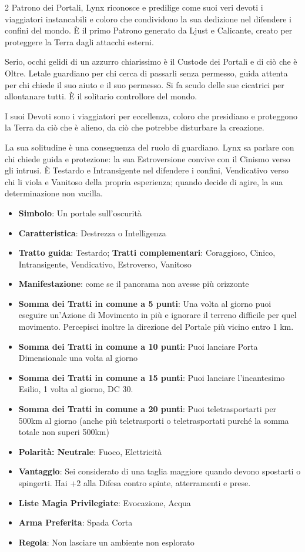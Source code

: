 \begin{multicols}{2}
Patrono dei Portali, Lynx riconosce e predilige come suoi veri devoti i viaggiatori instancabili e coloro che condividono la sua dedizione nel difendere i confini del mondo. È il primo Patrono generato da Ljust e Calicante, creato per proteggere la Terra dagli attacchi esterni.

Serio, occhi gelidi di un azzurro chiarissimo è il Custode dei Portali e di ciò che è Oltre. Letale guardiano per chi cerca di passarli senza permesso, guida attenta per chi chiede il suo aiuto e il suo permesso. Si fa scudo delle sue cicatrici per allontanare tutti. È il solitario controllore del mondo.

I suoi Devoti sono i viaggiatori per eccellenza, coloro che presidiano e proteggono la Terra da ciò che è alieno, da ciò che potrebbe disturbare la creazione.

La sua solitudine è una conseguenza del ruolo di guardiano. Lynx sa parlare con chi chiede guida e protezione: la sua Estroversione convive con il Cinismo verso gli intrusi. È Testardo e Intransigente nel difendere i confini, Vendicativo verso chi li viola e Vanitoso della propria esperienza; quando decide di agire, la sua determinazione non vacilla.

\begin{itemize}[leftmargin=*] \setlength{\itemsep}{0pt}
\item \textbf{Simbolo}: Un portale sull'oscurità
\item \textbf{Caratteristica}: Destrezza o Intelligenza
\item \textbf{Tratto guida}: Testardo; \textbf{Tratti complementari}: Coraggioso, Cinico, Intransigente, Vendicativo, Estroverso, Vanitoso
\item \textbf{Manifestazione}: come se il panorama non avesse più orizzonte
\item \textbf{Somma dei Tratti in comune a 5 punti}: Una volta al giorno puoi eseguire un'Azione di Movimento in più e ignorare il terreno difficile per quel movimento. Percepisci inoltre la direzione del Portale più vicino entro 1 km.
\item \textbf{Somma dei Tratti in comune a 10 punti}: Puoi lanciare Porta Dimensionale una volta al giorno
\item \textbf{Somma dei Tratti in comune a 15 punti}: Puoi lanciare l'incantesimo Esilio, 1 volta al giorno, DC 30.
\item \textbf{Somma dei Tratti in comune a 20 punti}: Puoi teletrasportarti per 500km al giorno (anche più teletrasporti o teletrasportati purché la somma totale non superi 500km)
\item \textbf{Polarità: Neutrale}: Fuoco, Elettricità
\item \textbf{Vantaggio}: Sei considerato di una taglia maggiore quando devono spostarti o spingerti. Hai +2 alla Difesa contro spinte, atterramenti e prese.
\item \textbf{Liste Magia Privilegiate}: Evocazione, Acqua
\item \textbf{Arma Preferita}: Spada Corta
\item \textbf{Regola}: Non lasciare un ambiente non esplorato
\end{itemize}


\end{multicols}
